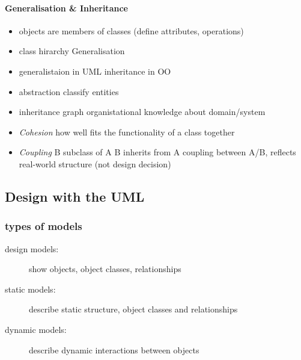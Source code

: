 \documentclass[a4paper, 10pt]{article}
\begin{document}
\paragraph{Generalisation \& Inheritance}
\begin{itemize}
	\item objects are members of classes (define attributes, operations)
	\item class hirarchy \follows Generalisation
	\item generalistaion in UML \follows inheritance in OO
	\item abstraction \follows classify entities
	\item inheritance graph \follows organistational knowledge about domain/system
	\item \emph{Cohesion} how well fits the functionality of a class together
	\item \emph{Coupling} B subclass of A \follows B inherits from A \follows coupling between A/B, reflects real-world structure (not design decision)
\end{itemize}

\subsection{Design with the UML}
\subsubsection{types of models}
\begin{description}
	\item[design models:] show objects, object classes, relationships
	\item[static models:] describe static structure, object classes and relationships
	\item[dynamic models:] describe dynamic interactions between objects
\end{description}
\end{document}
